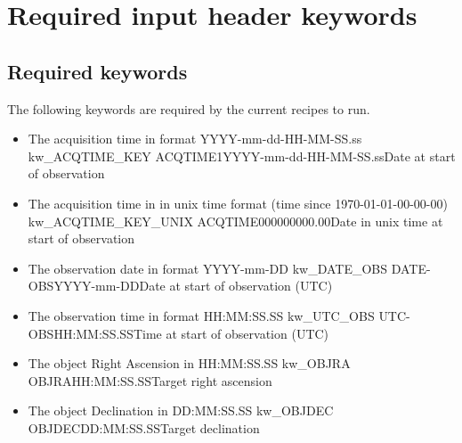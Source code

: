 \chapter{Required input header keywords}
\label{ch:input_keywords}

\section{Required keywords}

The following keywords are required by the current recipes to run.

\begin{itemize}

\item {} 
{The acquisition time in format YYYY-mm-dd-HH-MM-SS.ss}
{kw\_ACQTIME\_KEY}
{ACQTIME1}{YYYY-mm-dd-HH-MM-SS.ss}{Date at start of observation}
{\AllRecipes}{\spirouKeywords}{\spirouKeywords}

\item {}
{The acquisition time in in unix time format (time since 1970-01-01-00-00-00)}
{kw\_ACQTIME\_KEY\_UNIX}
{ACQTIME}{000000000.00}{Date in unix time at start of observation}
{\AllRecipes}{\spirouKeywords}{\spirouKeywords}

\item {}
{The observation date in format YYYY-mm-DD}
{kw\_DATE\_OBS}
{DATE-OBS}{YYYY-mm-DD}{Date at start of observation (UTC)}
{\AllRecipes}{\spirouKeywords}{\spirouKeywords}

\item {}
{The observation time in format HH:MM:SS.SS}
{kw\_UTC\_OBS}
{UTC-OBS}{HH:MM:SS.SS}{Time at start of observation (UTC)}
{\AllRecipes}{\spirouKeywords}{\spirouKeywords}

\item {}
{The object Right Ascension in HH:MM:SS.SS}
{kw\_OBJRA}
{OBJRA}{HH:MM:SS.SS}{Target right ascension}
{\AllRecipes}{\spirouKeywords}{\spirouKeywords}

\item {}
{The object Declination in DD:MM:SS.SS}
{kw\_OBJDEC}
{OBJDEC}{DD:MM:SS.SS}{Target declination}
{\AllRecipes}{\spirouKeywords}{\spirouKeywords}


\end{itemize}
